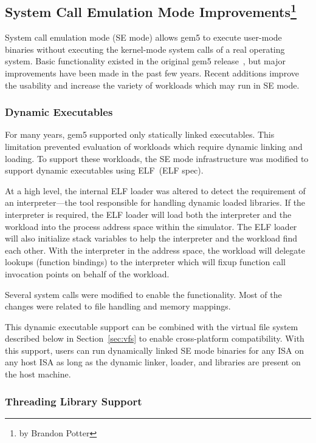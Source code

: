\subsection[System Call Emulation Mode Improvements]{System Call Emulation Mode Improvements\footnote{by Brandon Potter}}
\label{sec:se-mode}

System call emulation mode (SE mode) allows gem5 to execute user-mode binaries without executing the kernel-mode system calls of a real operating system.
Basic functionality existed in the original gem5 release~\cite{Binkert-gem5-2011}, but major improvements have been made in the past few years.
Recent additions improve the usability and increase the variety of workloads which may run in SE mode.

\subsubsection{Dynamic Executables}

For many years, gem5 supported only statically linked executables.
This limitation prevented evaluation of workloads which require dynamic linking and loading.
To support these workloads, the SE mode infrastructure was modified to support dynamic executables using ELF~\cite{}(ELF spec).

At a high level, the internal ELF loader was altered to detect the requirement of an interpreter---the tool responsible for handling dynamic loaded libraries.
If the interpreter is required, the ELF loader will load both the interpreter and the workload into the process address space within the simulator.
The ELF loader will also initialize stack variables to help the interpreter and the workload find each other.
With the interpreter in the address space, the workload will delegate lookups (function bindings) to the interpreter which will fixup function call invocation points on behalf of the workload.

Several system calls were modified to enable the functionality.
Most of the changes were related to file handling and memory mappings.

This dynamic executable support can be combined with the virtual file system described below in Section~\ref{sec:vfs} to enable cross-platform compatibility.
With this support, users can run dynamically linked SE mode binaries for any ISA on any host ISA as long as the dynamic linker, loader, and libraries are present on the host machine.

\subsubsection{Threading Library Support}

